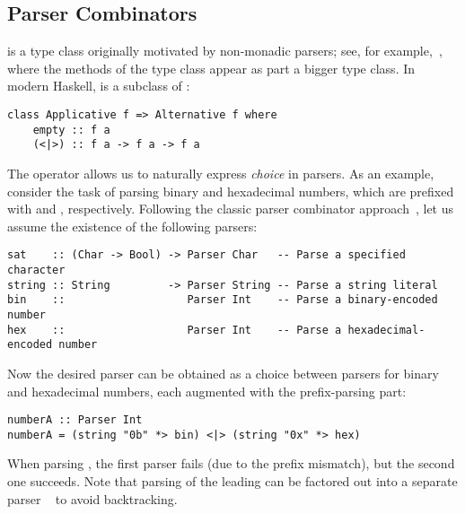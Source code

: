 \subsection{Parser Combinators}\label{sec-alternative-functors}

 is a type class originally motivated by non-monadic parsers;
see, for example,~\citet{swierstra1996parsers}, where the methods of the
 type class appear as part a bigger  type class. In
modern Haskell,  is a subclass of :

\vspace{1mm}
\begin{verbatim}
class Applicative f => Alternative f where
    empty :: f a
    (<|>) :: f a -> f a -> f a
\end{verbatim}
\vspace{1mm}

\noindent
The operator \hs{<|>} allows us to naturally express \emph{choice} in parsers.
As an example, consider the task of parsing binary and hexadecimal numbers,
which are prefixed with  and , respectively. Following the
classic parser combinator approach~\citep{hutton1998monadic}, let us assume the
existence of the following parsers:

\vspace{1mm}
\begin{verbatim}
sat    :: (Char -> Bool) -> Parser Char   -- Parse a specified character
string :: String         -> Parser String -- Parse a string literal
bin    ::                   Parser Int    -- Parse a binary-encoded number
hex    ::                   Parser Int    -- Parse a hexadecimal-encoded number
\end{verbatim}
\vspace{1mm}

\noindent
Now the desired parser can be obtained as a choice between parsers for binary
and hexadecimal numbers, each augmented with the prefix-parsing part:

\vspace{1mm}
\begin{verbatim}
numberA :: Parser Int
numberA = (string "0b" *> bin) <|> (string "0x" *> hex)
\end{verbatim}
\vspace{1mm}

\noindent
When parsing , the first parser fails (due to the prefix mismatch),
but the second one succeeds. Note that parsing of the leading  can be
factored out into a separate parser ~ to avoid backtracking.

